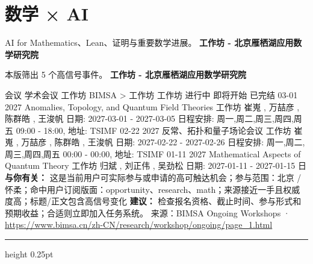 \documentclass[10.5pt]{ctexart}
\begin{document}
\section*{数学 × AI}
{\color{ormuted} AI for Mathematics、Lean、证明与重要数学进展。}
\vspace{2mm}
{\LARGE\bfseries 工作坊 - 北京雁栖湖应用数学研究院}\par
\vspace{1mm}
{\color{ormuted} 本版筛出 5 个高信号事件。}
\vspace{3mm}
{\Large\bfseries 工作坊 - 北京雁栖湖应用数学研究院}\par
会议 学术会议 工作坊 BIMSA > 工作坊 工作坊 进行中 即将开始 已完结 03-01 2027 Anomalies, Topology, and Quantum Field Theories 工作坊 崔嵬 , 万喆彦 , 陈群皓 , 王浚帆 日期: 2027-03-01 - 2027-03-05 日程安排: 周一,周二,周三,周四,周五 09:00 - 18:00, 地址: TSIMF 02-22 2027 反常、拓扑和量子场论会议 工作坊 崔嵬 , 万喆彦 , 陈群皓 , 王浚帆 日期: 2027-02-22 - 2027-02-26 日程安排: 周一,周二,周三,周四,周五 00:00 - 00:00, 地址: TSIMF 01-11 2027 Mathematical Aspects of Quantum Theory 工作坊 归斌 , 刘正伟 , 吴劲松 日期: 2027-01-11 - 2027-01-15 日
\textbf{与你有关：} 这是当前用户可实际参与或申请的高可触达机会；参与范围：北京 / 怀柔；命中用户订阅版面：opportunity、research、math；来源接近一手且权威度高；标题/正文包含高信号变化
\textbf{建议：} 检查报名资格、截止时间、参与形式和预期收益；合适则立即加入任务系统。
{\footnotesize\color{ormuted} 来源：BIMSA Ongoing Workshops · \url{https://www.bimsa.cn/zh-CN/research/workshop/ongoing/page_1.html}}
\vspace{4mm}
\hrule height 0.25pt
\vspace{3mm}
\end{document}
